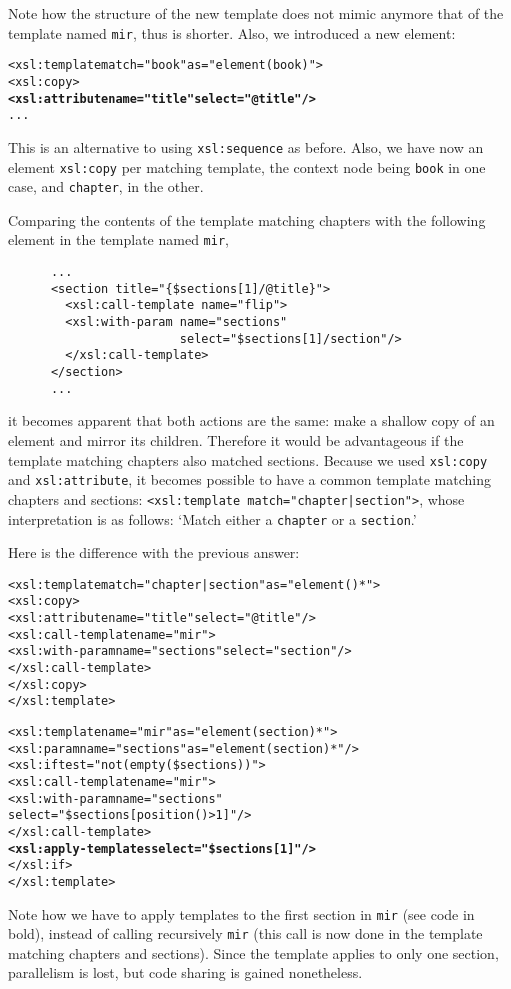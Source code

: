 Note how the structure of the new template does not mimic anymore that
of the template named \texttt{mir}, thus is shorter. Also, we
introduced a new \XSLT element:
\begin{alltt}
 <xsl:template match="book" as="element(book)">
    <xsl:copy>
      \textbf{<xsl:attribute name="title" select="@title"/>}
      ...
\end{alltt}
This is an alternative to using \texttt{xsl:sequence} as before. Also,
we have now an element \texttt{xsl:copy} per matching template, the
context node being \texttt{book} in one case, and \texttt{chapter}, in
the other.

Comparing the contents of the template matching chapters with the
following element in the template named \texttt{mir},
\begin{verbatim}
      ...
      <section title="{$sections[1]/@title}">
        <xsl:call-template name="flip">
        <xsl:with-param name="sections"
                        select="$sections[1]/section"/>
        </xsl:call-template>
      </section>
      ...
\end{verbatim}
it becomes apparent that both actions are the same: make a shallow
copy of an element and mirror its children. Therefore it would be
advantageous if the template matching chapters also matched
sections. Because we used \texttt{xsl:copy} and
\texttt{xsl:attribute}, it becomes possible to have a common template
matching chapters and sections: \texttt{<xsl:template
  match="chapter|section">}, whose interpretation is as follows:
`Match either a \texttt{chapter} or a \texttt{section}.'

Here is the difference with the previous answer:
\begin{alltt}
  <xsl:template match="chapter|section" as="element()*">
    <xsl:copy>
      <xsl:attribute name="title" select="@title"/>
      <xsl:call-template name="mir">
        <xsl:with-param name="sections" select="section"/>
      </xsl:call-template>
    </xsl:copy>
  </xsl:template>

  <xsl:template name="mir" as="element(section)*">
    <xsl:param name="sections" as="element(section)*"/>
    <xsl:if test="not(empty(\$sections))">
      <xsl:call-template name="mir">
        <xsl:with-param name="sections"
                        select="\$sections[position()>1]"/>
      </xsl:call-template>
      \textbf{<xsl:apply-templates select="\$sections[1]"/>}
    </xsl:if>
  </xsl:template>
\end{alltt}
Note how we have to apply templates to the first section in
\texttt{mir} (see code in bold), instead of calling recursively
\texttt{mir} (this call is now done in the template matching chapters
and sections). Since the template applies to only one section,
parallelism is lost, but code sharing is gained nonetheless.


